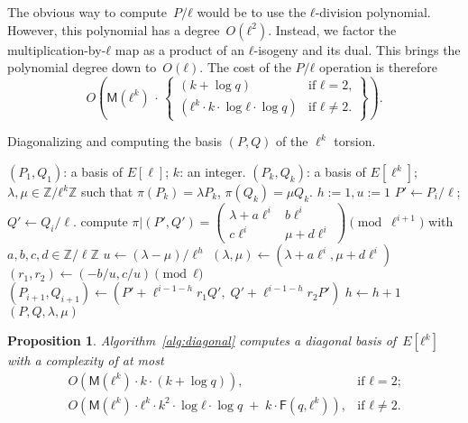 \documentclass{lms}
\newtheorem{prop}[thm]{Proposition}
\def\pa#1{\left(#1\right)}
\def\cout#1{\mathsf{#1}}
\begin{document}
The obvious way to compute~$P/ℓ$ would be to use the $ℓ$-division polynomial.
However, this polynomial has a degree~$O(ℓ^2)$.
Instead, we factor the multiplication-by-$ℓ$ map
as a product of an $ℓ$-isogeny and its dual.
This brings the polynomial degree down to~$O(ℓ)$.
The cost of the $P/ℓ$ operation is therefore
\begin{equation}\label{eq:div-by-l}
O \pa{\cout{M}(ℓ^k) \,· \,\left\lbrace\begin{array}{ll}
(k + \log q) & \text{if $ℓ = 2$,} \\
(ℓ^k · k · \log ℓ · \log q) & \text{if $ℓ ≠ 2$.}
\end{array}\right\rbrace}.
\end{equation}

\begin{algorithm}
\caption{\label{alg:diagonal}Diagonalizing and computing the basis $(P,Q)$ of the $\ell^k$ torsion.}
\begin{algorithmic}[1]
\REQUIRE $(P_1, Q_1 )$: a basis of $E[\ell]$;
$k$: an integer.
\ENSURE $(P_k, Q_k )$: a basis of $E[\ell^k]$;
$λ, μ ∈ ℤ/ℓ^k ℤ$
such that $\pi(P_k)= λ P_k$, $ \pi(Q_k)= μ Q_k$.
\STATE $h:=1, u:=1$
\STATE $P' \leftarrow P_i/\ell$; $Q' \leftarrow Q_i/\ell$.
\STATE compute $\pi|(P',Q')=\left( \begin{array}{cc}
λ + a\ell^{i} & b\ell^{i}\\
c\ell^{i} & μ + d\ell^{i}
\end{array} \right) \pmod {\ell^{i+1}}$
with $a,b,c,d \in \mathbb{Z}/\ell\mathbb{Z}$
\STATE $u \leftarrow (λ -μ)/\ell^h$
\ENDIF
\STATE $(λ, μ) \gets
  (λ + a\ell^i, μ + d\ell^i)$
\STATE $(r_1,r_2) \gets (-b/u , c/u) \pmod{ℓ}$
\STATE $(P_{i+1},Q_{i+1}) \gets
  (P'+\ell^{i-1-h}r_1 Q',\;Q'+\ell^{i-1-h}r_2 P')$
\STATE $h \leftarrow h+1$
\ENDIF
\ENDFOR
\RETURN $(P,Q,λ,μ)$
\end{algorithmic}
\end{algorithm}
\begin{prop}
Algorithm~\ref{alg:diagonal} computes a diagonal basis of~$E[ℓ^k]$
with a complexity of at most
\begin{equation*}
\begin{array}{ll}
O\pa{\cout{M}(ℓ^k) · k · (k + \log q)}, &\text{if $ℓ = 2$;}\\
O\pa{\cout{M}(ℓ^k) · ℓ^k · k^2 · \log ℓ · \log q
  \;+\; k · \cout{F}(q, ℓ^k)}, &\text{if $ℓ ≠ 2$.}
\end{array}
\end{equation*}
\end{prop}
\end{document}
